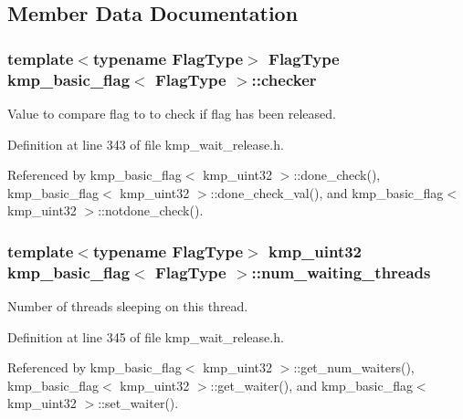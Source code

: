 \subsection{Member Data Documentation}
\hypertarget{classkmp__basic__flag_ab23a153efd5b913c52cfe0999722812f}{
\subsubsection[{checker}]{\setlength{\rightskip}{0pt plus 5cm}template$<$typename Flag\-Type$>$ Flag\-Type {\bf kmp\-\_\-basic\-\_\-flag}$<$ Flag\-Type $>$\-::checker\hspace{0.3cm}{\ttfamily [private]}}}\label{classkmp__basic__flag_ab23a153efd5b913c52cfe0999722812f}
Value to compare flag to to check if flag has been released. 

Definition at line 343 of file kmp\-\_\-wait\-\_\-release.\-h.



Referenced by kmp\-\_\-basic\-\_\-flag$<$ kmp\-\_\-uint32 $>$\-::done\-\_\-check(), kmp\-\_\-basic\-\_\-flag$<$ kmp\-\_\-uint32 $>$\-::done\-\_\-check\-\_\-val(), and kmp\-\_\-basic\-\_\-flag$<$ kmp\-\_\-uint32 $>$\-::notdone\-\_\-check().

\hypertarget{classkmp__basic__flag_a71d958593d12ea5389ca5a32864d276c}{
\subsubsection[{num\-\_\-waiting\-\_\-threads}]{\setlength{\rightskip}{0pt plus 5cm}template$<$typename Flag\-Type$>$ kmp\-\_\-uint32 {\bf kmp\-\_\-basic\-\_\-flag}$<$ Flag\-Type $>$\-::num\-\_\-waiting\-\_\-threads\hspace{0.3cm}{\ttfamily [private]}}}\label{classkmp__basic__flag_a71d958593d12ea5389ca5a32864d276c}
Number of threads sleeping on this thread. 

Definition at line 345 of file kmp\-\_\-wait\-\_\-release.\-h.



Referenced by kmp\-\_\-basic\-\_\-flag$<$ kmp\-\_\-uint32 $>$\-::get\-\_\-num\-\_\-waiters(), kmp\-\_\-basic\-\_\-flag$<$ kmp\-\_\-uint32 $>$\-::get\-\_\-waiter(), and kmp\-\_\-basic\-\_\-flag$<$ kmp\-\_\-uint32 $>$\-::set\-\_\-waiter().

